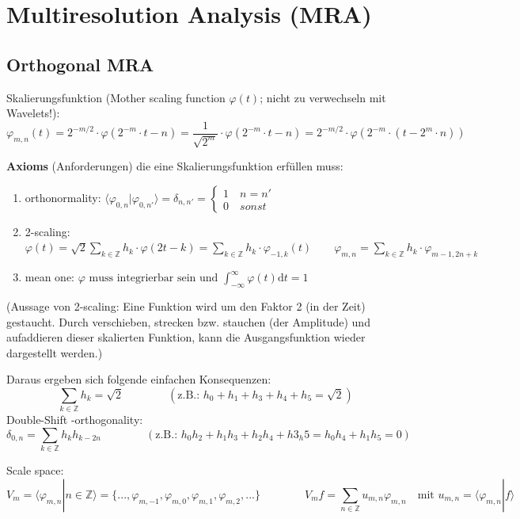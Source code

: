 \section{Multiresolution Analysis (MRA)}

\subsection{Orthogonal MRA}
Skalierungsfunktion (Mother scaling function $\varphi(t)$; nicht zu verwechseln mit Wavelets!): 
\[
	\varphi_{m,n}(t)=2^{-m/2} \cdot \varphi(2^{-m}\cdot t - n) = \frac{1}{\sqrt{2^{m}}} \cdot \varphi(2^{-m}\cdot t -n) = 2^{-m/2} \cdot \varphi(2^{-m}\cdot (t - 2^{m}\cdot n))
\]

\textbf{Axioms} (Anforderungen) die eine Skalierungsfunktion erfüllen muss:
\begin{enumerate}
	\item orthonormality: $ \langle \varphi_{0,n}|\varphi_{0,n'} \rangle = \delta_{n,n'} =  \begin{cases} 1 \quad n=n'\\ 0 \quad sonst  \end{cases}  $
	\item 2-scaling: $ \varphi(t) = \sqrt{2} \sum_{k \in \mathbb{Z}} h_k \cdot \varphi(2t-k) = \sum_{k \in \mathbb{Z}} h_k \cdot \varphi_{-1,k}(t) \qquad \varphi_{m,n}=\sum_{k \in \mathbb{Z}} h_k \cdot \varphi_{m-1,2n+k} $
	\item mean one: $ \varphi \text{ muss integrierbar sein und } \int_{-\infty}^{\infty}\varphi(t) \mathrm{d}t = 1 $
\end{enumerate}

(Aussage von 2-scaling: Eine Funktion wird um den Faktor 2 (in der Zeit) gestaucht. Durch verschieben, strecken bzw. stauchen (der Amplitude) und aufaddieren dieser skalierten Funktion, kann die  Ausgangsfunktion wieder dargestellt werden.)

Daraus ergeben sich folgende einfachen Konsequenzen:
\[ 
	\sum_{k \in \mathbb{Z}} h_k = \sqrt{2} \qquad \qquad (\text{z.B.: } h_0 + h_1 + h_3 + h_4 + h_5 = \sqrt{2})
\]
Double-Shift -orthogonality:
\[
	\delta_{0,n} = \sum_{k \in \mathbb{Z}} h_k h_{k-2n} 
	\qquad \qquad 
	(\text{z.B.: } h_0h_2 + h_1h_3 + h_2h_4 + h3_h5 = h_0h_4+h_1h_5 = 0 )
\]

Scale space: 
\[
	V_m = \langle \varphi_{m,n}|n \in \mathbb{Z}  \rangle = \{ ...,\varphi_{m,-1},\varphi_{m,0}, \varphi_{m,1}, \varphi_{m,2},... \}
	\qquad \qquad
	V_mf = \sum_{n \in \mathbb{Z}} u_{m,n}\varphi_{m,n} \quad \text{mit } u_{m,n}=\langle \varphi_{m,n}|f \rangle
\]


